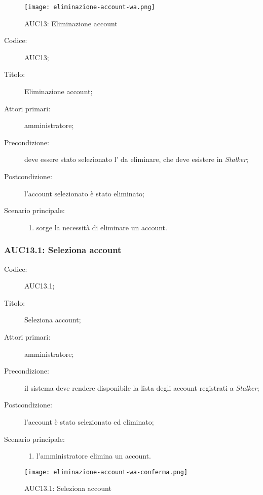 \documentclass[../../../analisi-dei-requisiti.tex]{subfiles}
\begin{document}
\begin{figure}[H]
  \centering
  \texttt{[image: eliminazione-account-wa.png]}
  \caption{AUC13: Eliminazione account}%
  \label{fig:AUC13}
\end{figure}

\begin{description}
  \item[Codice:] AUC13;
  \item[Titolo:] Eliminazione account;
  \item[Attori primari:] amministratore;
  \item[Precondizione:] deve essere stato selezionato l' da eliminare, che deve esistere in \emph{Stalker};
  \item[Postcondizione:] l'account selezionato è stato eliminato;
  \item[Scenario principale:]
  \begin{enumerate}
    \item sorge la necessità di eliminare un account.
  \end{enumerate}
\end{description}

\subsubsection{AUC13.1: Seleziona account}%
\label{subs:AUC13.1}
\begin{description}
  \item[Codice:] AUC13.1;
  \item[Titolo:] Seleziona account;
  \item[Attori primari:] amministratore;
  \item[Precondizione:] il sistema deve rendere disponibile la lista degli account registrati a \emph{Stalker};
  \item[Postcondizione:] l'account è stato selezionato ed eliminato;
  \item[Scenario principale:]
  \begin{enumerate}
    \item l'amministratore elimina un account.
  \end{enumerate}
\end{description}

\begin{figure}[H]
  \centering
  \texttt{[image: eliminazione-account-wa-conferma.png]}
  \caption{AUC13.1: Seleziona account}%
  \label{fig:AUC13.1}
\end{figure}
\end{document}
